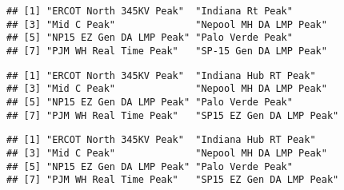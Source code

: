 \documentclass[
]{article}
\newenvironment{Shaded}{\begin{snugshade}}{\end{snugshade}}
\newcommand{\AttributeTok}[1]{\textcolor[rgb]{0.13,0.29,0.53}{#1}}
\newcommand{\CommentTok}[1]{\textcolor[rgb]{0.56,0.35,0.01}{\textit{#1}}}
\newcommand{\FunctionTok}[1]{\textcolor[rgb]{0.13,0.29,0.53}{\textbf{#1}}}
\newcommand{\NormalTok}[1]{#1}
\newcommand{\SpecialCharTok}[1]{\textcolor[rgb]{0.81,0.36,0.00}{\textbf{#1}}}
\newcommand{\StringTok}[1]{\textcolor[rgb]{0.31,0.60,0.02}{#1}}
\begin{document}
\begin{Shaded}
\end{Shaded}

\begin{verbatim}
## [1] "ERCOT North 345KV Peak"  "Indiana Rt Peak"        
## [3] "Mid C Peak"              "Nepool MH DA LMP Peak"  
## [5] "NP15 EZ Gen DA LMP Peak" "Palo Verde Peak"        
## [7] "PJM WH Real Time Peak"   "SP-15 Gen DA LMP Peak"
\end{verbatim}

\begin{Shaded}
\end{Shaded}

\begin{verbatim}
## [1] "ERCOT North 345KV Peak"  "Indiana Hub RT Peak"    
## [3] "Mid C Peak"              "Nepool MH DA LMP Peak"  
## [5] "NP15 EZ Gen DA LMP Peak" "Palo Verde Peak"        
## [7] "PJM WH Real Time Peak"   "SP15 EZ Gen DA LMP Peak"
\end{verbatim}

\begin{Shaded}
\end{Shaded}

\begin{verbatim}
## [1] "ERCOT North 345KV Peak"  "Indiana Hub RT Peak"    
## [3] "Mid C Peak"              "Nepool MH DA LMP Peak"  
## [5] "NP15 EZ Gen DA LMP Peak" "Palo Verde Peak"        
## [7] "PJM WH Real Time Peak"   "SP15 EZ Gen DA LMP Peak"
\end{verbatim}
\end{document}
